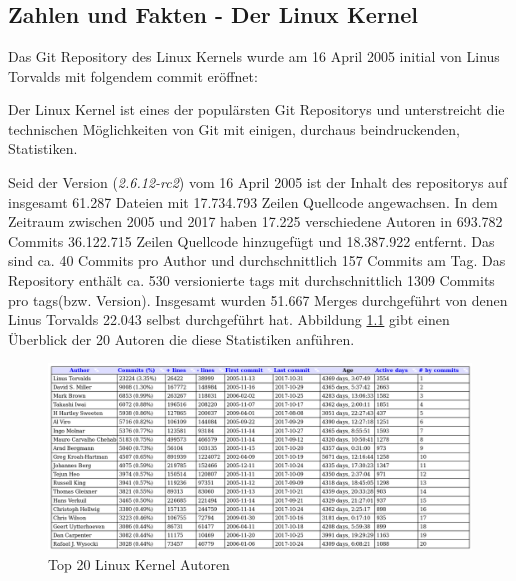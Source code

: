 \chapter{\lookout}
\label{cha:lookout}
\section{Zahlen und Fakten - Der Linux Kernel}\label{sec:kernel}
Das Git Repository des Linux Kernels wurde am 16 April 2005 initial von Linus
Torvalds mit folgendem \gls{commit}\cite{link:linuxgit} eröffnet:



Der Linux Kernel ist eines der populärsten Git Repositorys und unterstreicht
die technischen Möglichkeiten von Git mit einigen, durchaus beindruckenden,
Statistiken.

Seid der Version (\textit{2.6.12-rc2}) vom 16 April 2005 ist der Inhalt des
\glspl{repository} auf insgesamt 61.287 Dateien mit 17.734.793 Zeilen Quellcode
angewachsen. In dem Zeitraum zwischen 2005 und 2017 haben 17.225 verschiedene
Autoren in 693.782 Commits 36.122.715 Zeilen Quellcode hinzugefügt und
18.387.922 entfernt. Das sind ca. 40 Commits pro Author und durchschnittlich
157 Commits am Tag. Das Repository enthält ca. 530 versionierte \glspl{tag}
mit durchschnittlich 1309 Commits pro \glspl{tag}(bzw. Version). Insgesamt wurden
51.667 Merges durchgeführt von denen Linus Torvalds 22.043 selbst durchgeführt
hat. Abbildung \ref{top20} gibt einen Überblick der 20 Autoren die diese
Statistiken anführen.

\begin{figure}
	\centering
  \includegraphics[scale=0.40]{images/top_20_of_linux_authors.png}
	\caption{Top 20 Linux Kernel Autoren}
	\label{top20}
\end{figure}


